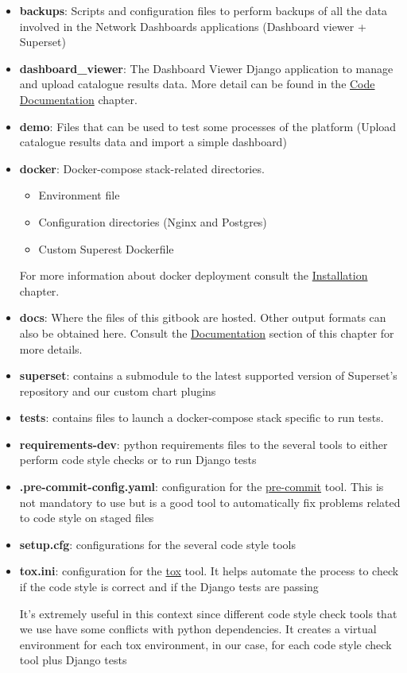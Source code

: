 \documentclass[
]{book}
\providecommand{\tightlist}{%
  \setlength{\itemsep}{0pt}\setlength{\parskip}{0pt}}
\begin{document}
\begin{itemize}
\item
  \textbf{backups}: Scripts and configuration files to perform backups of all the data involved in the Network Dashboards applications (Dashboard viewer + Superset)
\item
  \textbf{dashboard\_viewer}: The Dashboard Viewer Django application to manage and upload catalogue results data. More detail can be found in the \href{code-documentation.html}{Code Documentation} chapter.
\item
  \textbf{demo}: Files that can be used to test some processes of the platform (Upload catalogue results data and import a simple dashboard)
\item
  \textbf{docker}: Docker-compose stack-related directories.

  \begin{itemize}
  \tightlist
  \item
    Environment file
  \item
    Configuration directories (Nginx and Postgres)
  \item
    Custom Superest Dockerfile
  \end{itemize}

  For more information about docker deployment consult the \href{installation.html}{Installation} chapter.
\item
  \textbf{docs}: Where the files of this gitbook are hosted. Other output formats can also be obtained here. Consult the \href{development-instructions.html\#documentation}{Documentation} section of this chapter for more details.
\item
  \textbf{superset}: contains a submodule to the latest supported version of Superset's repository and our custom chart plugins
\item
  \textbf{tests}: contains files to launch a docker-compose stack specific to run tests.
\item
  \textbf{requirements-dev}: python requirements files to the several tools to either perform code style checks or to run Django tests
\item
  \textbf{.pre-commit-config.yaml}: configuration for the \href{https://pre-commit.com/}{pre-commit} tool. This is not mandatory to use but is a good tool to automatically fix problems related to code style on staged files
\item
  \textbf{setup.cfg}: configurations for the several code style tools
\item
  \textbf{tox.ini}: configuration for the \href{https://tox.readthedocs.io/}{tox} tool. It helps automate the process to check if the code style is correct and if the Django tests are passing

  It's extremely useful in this context since different code style check tools that we use have some conflicts with python dependencies. It creates a virtual environment for each tox environment, in our case, for each code style check tool plus Django tests
\end{itemize}
\end{document}
